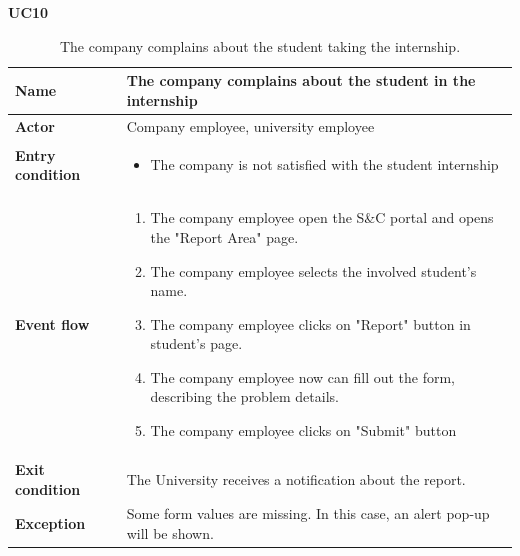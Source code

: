     \textbf{UC10}
    \nopagebreak
    \begin{table}[H]
        \centering
        \begin{tabular}{|l|p{11.9cm}|}
        \hline
        \textbf{Name}            & The company complains about the student in the internship \\\hline
        \textbf{Actor}           & Company employee, university employee    \\\hline
        \textbf{Entry condition} &
        \begin{itemize}
              \item The company is not satisfied with the student internship
        \end{itemize}                                        \\\hline
        \textbf{Event flow}      &
        \begin{enumerate}[label=\arabic*.]
              \item The company employee open the S\&C portal and opens the "Report Area" page.
              \item The company employee selects the involved student's name.
              \item The company employee clicks on "Report" button in student's page.
              \item The company employee now can fill out the form, describing the problem details.
              \item The company employee clicks on "Submit" button
        \end{enumerate}            \\\hline
        \textbf{Exit condition}  & The University receives a notification about the report.\\\hline
        \textbf{Exception}       &  Some form values are missing. In this case, an alert pop-up will be shown.\\\hline
        \end{tabular}
        \caption{The company complains about the student taking the internship.}
        \label{table:The company complains about the student taking the internship}
    \end{table}


